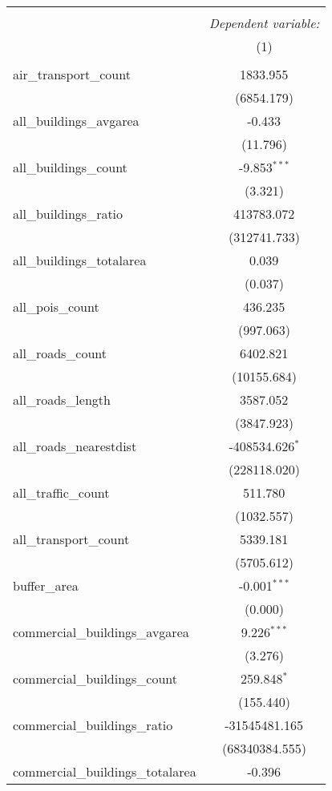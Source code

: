 \begin{table}[!htbp] \centering
\begin{tabular}{@{\extracolsep{5pt}}lc}
\\[-1.8ex]\hline
\hline \\[-1.8ex]
& \multicolumn{1}{c}{\textit{Dependent variable:}} \
\cr \cline{1-2}
\\[-1.8ex] & (1) \\
\hline \\[-1.8ex]
 air_transport_count & 1833.955$^{}$ \\
  & (6854.179) \\
 all_buildings_avgarea & -0.433$^{}$ \\
  & (11.796) \\
 all_buildings_count & -9.853$^{***}$ \\
  & (3.321) \\
 all_buildings_ratio & 413783.072$^{}$ \\
  & (312741.733) \\
 all_buildings_totalarea & 0.039$^{}$ \\
  & (0.037) \\
 all_pois_count & 436.235$^{}$ \\
  & (997.063) \\
 all_roads_count & 6402.821$^{}$ \\
  & (10155.684) \\
 all_roads_length & 3587.052$^{}$ \\
  & (3847.923) \\
 all_roads_nearestdist & -408534.626$^{*}$ \\
  & (228118.020) \\
 all_traffic_count & 511.780$^{}$ \\
  & (1032.557) \\
 all_transport_count & 5339.181$^{}$ \\
  & (5705.612) \\
 buffer_area & -0.001$^{***}$ \\
  & (0.000) \\
 commercial_buildings_avgarea & 9.226$^{***}$ \\
  & (3.276) \\
 commercial_buildings_count & 259.848$^{*}$ \\
  & (155.440) \\
 commercial_buildings_ratio & -31545481.165$^{}$ \\
  & (68340384.555) \\
 commercial_buildings_totalarea & -0.396$^{}$ \\

\end{tabular}
\end{table}
